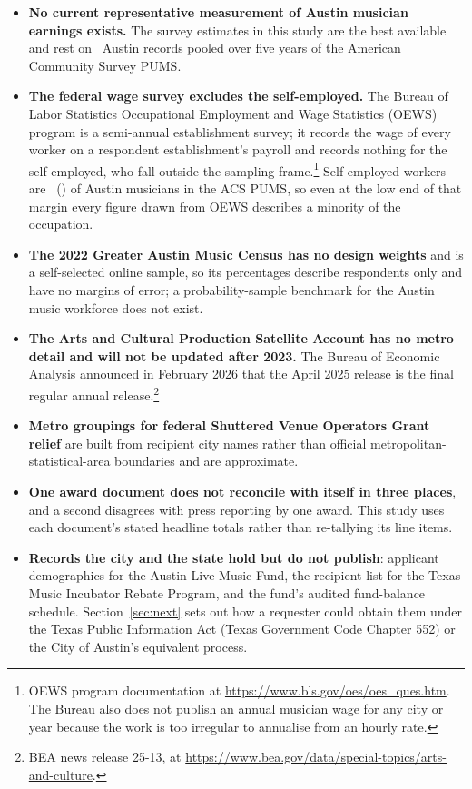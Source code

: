 \begin{itemize}
\item \textbf{No current representative measurement of Austin musician
      earnings exists.} The survey estimates in this study are the best
      available and rest on \NPumsAustinMusNPos\ Austin records pooled over
      five years of the American Community Survey PUMS.
\item \textbf{The federal wage survey excludes the self-employed.} The
      Bureau of Labor Statistics Occupational Employment and Wage
      Statistics (OEWS) program is a semi-annual establishment survey; it
      records the wage of every worker on a respondent establishment's
      payroll and records nothing for the self-employed, who fall outside
      the sampling frame.\footnote{OEWS program documentation at
      \url{https://www.bls.gov/oes/oes_ques.htm}. The Bureau also does not
      publish an annual musician wage for any city or year because the work
      is too irregular to annualise from an hourly rate.} Self-employed
      workers are \NPumsAustinMusSelfemp\ (\NPumsAustinMusSelfempMoe) of
      Austin musicians in the ACS PUMS, so even at the low end of that
      margin every figure drawn from OEWS describes a minority of the
      occupation.
\item \textbf{The 2022 Greater Austin Music Census has no design weights}
      and is a self-selected online sample, so its percentages describe
      respondents only and have no margins of error; a probability-sample
      benchmark for the Austin music workforce does not exist.
\item \textbf{The Arts and Cultural Production Satellite Account has no
      metro detail and will not be updated after 2023.} The Bureau of
      Economic Analysis announced in February 2026 that the April 2025
      release is the final regular annual release.\footnote{BEA news
      release 25-13, at
      \url{https://www.bea.gov/data/special-topics/arts-and-culture}.}
\item \textbf{Metro groupings for federal Shuttered Venue Operators Grant
      relief} are built from recipient city names rather than official
      metropolitan-statistical-area boundaries and are approximate.
\item \textbf{One award document does not reconcile with itself in three
      places}, and a second disagrees with press reporting by one award.
      This study uses each document's stated headline totals rather than
      re-tallying its line items.
\item \textbf{Records the city and the state hold but do not publish}:
      applicant demographics for the Austin Live Music Fund, the recipient
      list for the Texas Music Incubator Rebate Program, and the fund's
      audited fund-balance schedule. Section~\ref{sec:next} sets out how a
      requester could obtain them under the Texas Public Information Act
      (Texas Government Code Chapter 552) or the City of Austin's
      equivalent process.
\end{itemize}

